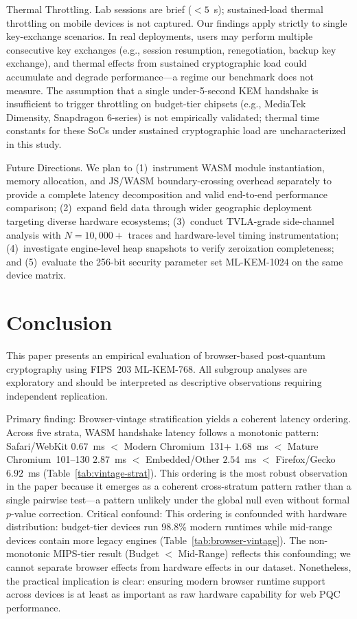 \documentclass[11pt,a4paper]{article}
\def\textbf#1{#1}%
\begin{document}
\textbf{Thermal Throttling.} Lab sessions are brief ($<5$~s); sustained-load thermal throttling on mobile devices is not captured. Our findings apply strictly to \textbf{single key-exchange scenarios}. In real deployments, users may perform multiple consecutive key exchanges (e.g., session resumption, renegotiation, backup key exchange), and thermal effects from sustained cryptographic load could accumulate and degrade performance---a regime our benchmark does not measure. The assumption that a single under-5-second KEM handshake is insufficient to trigger throttling on budget-tier chipsets (e.g., MediaTek Dimensity, Snapdragon 6-series) is \textbf{not empirically validated}; thermal time constants for these SoCs under sustained cryptographic load are uncharacterized in this study.

\textbf{Future Directions.} We plan to (1)~instrument WASM module instantiation, memory allocation, and JS/WASM boundary-crossing overhead separately to provide a complete latency decomposition and valid end-to-end performance comparison; (2)~expand field data through wider geographic deployment targeting diverse hardware ecosystems; (3)~conduct TVLA-grade side-channel analysis with $N=10{,}000+$ traces and hardware-level timing instrumentation; (4)~investigate engine-level heap snapshots to verify zeroization completeness; and (5)~evaluate the 256-bit security parameter set ML-KEM-1024 on the same device matrix.

\section{Conclusion}
\label{sec:conclusion}

This paper presents an empirical evaluation of browser-based post-quantum cryptography using FIPS~203 ML-KEM-768. All subgroup analyses are exploratory and should be interpreted as descriptive observations requiring independent replication.

\textbf{Primary finding: Browser-vintage stratification yields a coherent latency ordering.} Across five strata, WASM handshake latency follows a monotonic pattern: Safari/WebKit $0.67$~ms $<$ Modern Chromium~131+ $1.68$~ms $<$ Mature Chromium~101--130 $2.87$~ms $<$ Embedded/Other $2.54$~ms $<$ Firefox/Gecko $6.92$~ms (Table~\ref{tab:vintage-strat}). This ordering is the most robust observation in the paper because it emerges as a coherent cross-stratum pattern rather than a single pairwise test---a pattern unlikely under the global null even without formal $p$-value correction. \textbf{Critical confound:} This ordering is confounded with hardware distribution: budget-tier devices run 98.8\% modern runtimes while mid-range devices contain more legacy engines (Table~\ref{tab:browser-vintage}). The non-monotonic MIPS-tier result (Budget $<$ Mid-Range) reflects this confounding; we cannot separate browser effects from hardware effects in our dataset. Nonetheless, the practical implication is clear: \textbf{ensuring modern browser runtime support across devices is at least as important as raw hardware capability for web PQC performance.}
\end{document}
